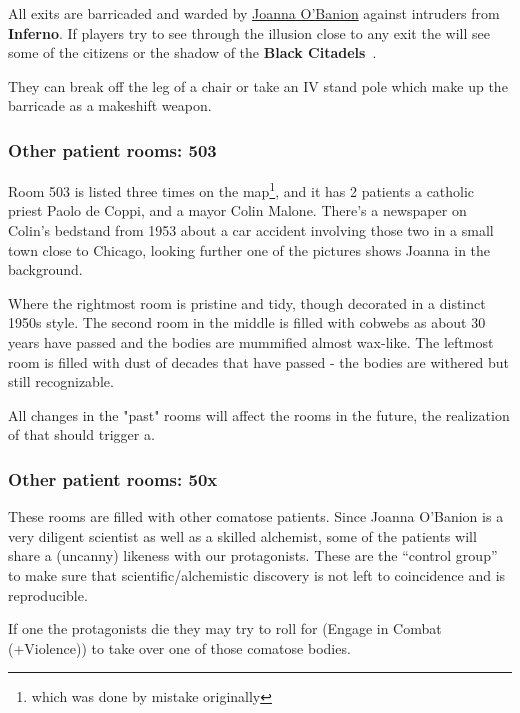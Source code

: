 \documentclass[bg-full]{resources/stylesheets/kult}
\begin{document}
All exits are barricaded and warded by \hyperref[ssub:joanna_o_banion]{Joanna O'Banion} against intruders from \textbf{Inferno}.
If players try to see through the illusion close to any exit the will see some of the citizens or the shadow of the
\textbf{Black Citadels}~\cite[p.316]{KULT:core}.

They can break off the leg of a chair or take an IV stand pole which make up the barricade as a makeshift weapon.

\subsubsection{Other patient rooms: 503}%
\label{ssub:other_patient_rooms_503}

Room 503 is listed three times on the map\footnote{which was done by mistake originally}, and it has 2 patients a catholic priest
Paolo de Coppi, and a mayor Colin Malone. There's a newspaper on Colin's bedstand from 1953 about a car accident involving those
two in a small town close to Chicago, looking further one of the pictures shows Joanna in the background.

Where the rightmost room is pristine and tidy, though decorated in a distinct 1950s style. The second room in the middle is filled
with cobwebs as about 30 years have passed and the bodies are mummified almost wax-like. The leftmost room is filled with dust of
decades that have passed - the bodies are withered but still recognizable.

All changes in the "past" rooms will affect the rooms in the future, the realization of that should trigger a.

\subsubsection{Other patient rooms: 50x}%
\label{ssub:other_patient_rooms}
These rooms are filled with other comatose patients.  Since Joanna O'Banion is a very diligent scientist as well as a skilled
alchemist, some of the patients will share a (uncanny) likeness with our protagonists.  These are the “control group” to make
sure that scientific/alchemistic discovery is not left to coincidence and is reproducible.

If one the protagonists die they may try to roll for \bluebf(Engage in Combat (+Violence)) to take over one of those comatose
bodies.
\end{document}
